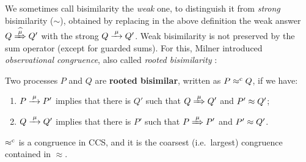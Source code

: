 We sometimes call bisimilarity the \emph{weak} one, to
distinguish it from \emph{strong} bisimilarity ($\sim$),
obtained by replacing in the above definition   the weak answer $
Q\Arcap\mu Q'$ with the strong  $Q \arr \mu Q'$.
Weak bisimilarity is not preserved by the sum operator (except for
guarded sums). For this, Milner introduced \emph{observational congruence}, also called \emph{rooted
  bisimilarity} \cite{Gorrieri:2015jt,Sangiorgi:2011ut}:
\begin{definition}%
\label{d:rootedBisimilarity}
Two processes $P$ and $Q$ are \textbf{rooted bisimilar}, written as $P
\mathrel{\approx^{\rm{c}}} Q$, if we have:
\begin{enumerate}
 \item  $P \arr\mu P'$ implies that there is $Q'$ such that $Q
   \Arr\mu Q'$ and $P' \approx Q'$;
 \item  $Q \arr\mu Q'$ implies that there is $P'$ such that $P
   \Arr\mu P'$ and $P' \approx Q'$. %
\end{enumerate}
\end{definition}

\begin{theorem}
\label{t:rapproxCongruence}
$\mathrel{\approx^{\rm{c}}}$ is a congruence in CCS, and it is the
coarsest (i.e.~largest) congruence contained in $\approx$.
\end{theorem}


